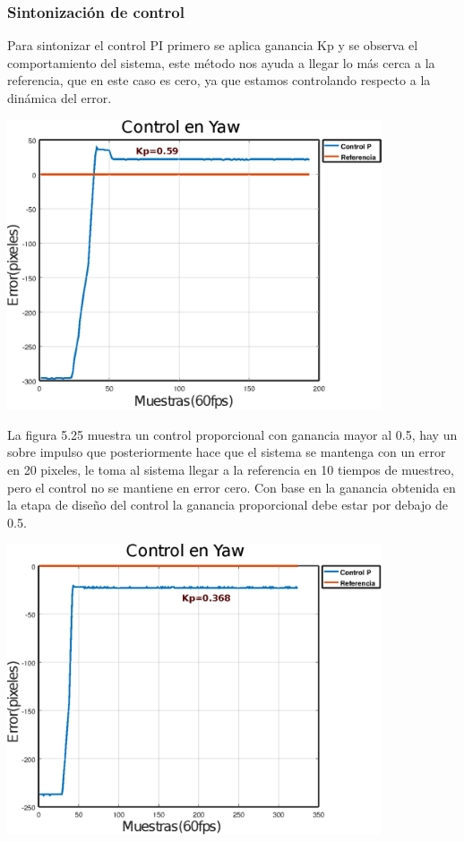 \subsubsection{Sintonización de control}
Para sintonizar el control PI primero se aplica ganancia Kp y se observa el comportamiento del sistema, este
método nos ayuda a llegar lo más cerca a la referencia, que en este caso es cero, ya que estamos controlando
respecto a la dinámica del error.
\begin{center}
	\includegraphics[width=0.83\textwidth]{Contenido/Cuerpo/Capitulo5/Fig30.eps}
	\label{Fig4}
\end{center}
La figura 5.25 muestra un control proporcional con ganancia mayor al 0.5, hay un sobre impulso que posteriormente
hace que el sistema se mantenga con un error en 20 pixeles, le toma al sistema llegar a la referencia en 10 tiempos de
muestreo, pero el control no se mantiene en error cero. Con base en la ganancia obtenida en la etapa de diseño del control la ganancia proporcional debe estar por debajo de 0.5.
\begin{center}
	\includegraphics[width=0.83\textwidth]{Contenido/Cuerpo/Capitulo5/Fig31.eps}
	\label{Fig4}
\end{center}
